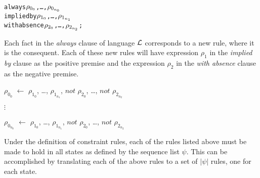 \documentclass[11pt]{report}
\newenvironment{vverbatim}
{
  \begin{alltt}
}
{
    \vspace{-\baselineskip}
  \end{alltt}
}
\newenvironment{vquote}
{
  \begin{list}{}{\leftmargin 1em}\item[]
}
{
  \end{list}
}
\begin{document}
            \begin{vverbatim}
  always \(\rho\sb{0\sb{0}}\), \ldots, \(\rho\sb{0\sb{n\sb{0}}}\)
    implied by \(\rho\sb{1\sb{0}}\), \ldots, \(\rho\sb{1\sb{n\sb{1}}}\)
    with absence \(\rho\sb{2\sb{0}}\), \ldots, \(\rho\sb{2\sb{n\sb{2}}}\);
            \end{vverbatim}

            Each fact in the {\em always} clause of language ${\cal L}$
            corresponds to a new rule, where it is the consequent. Each of
            these new rules will have expression $\rho_{1}$ in the
            {\em implied by} clause as the positive premise and the expression
            $\rho_{2}$ in the {\em with absence} clause as the negative
            premise.

            \begin{vquote}
              $\rho_{0_{0}}$ $\leftarrow$
                $\rho_{1_{0}}$, \ldots, $\rho_{1_{n_1}}$,
                $not$ $\rho_{2_{0}}$, \ldots, $not$ $\rho_{2_{n_2}}$

              $\vdots$

              $\rho_{0_{n_{0}}}$ $\leftarrow$
                $\rho_{1_{0}}$, \ldots, $\rho_{1_{n_1}}$,
                $not$ $\rho_{2_{0}}$, \ldots, $not$ $\rho_{2_{n_2}}$
            \end{vquote}

            Under the definition of constraint rules, each of the rules listed
            above must be made to hold in all states as defined by the sequence
            list $\psi$. This can be accomplished by translating each of the
            above rules to a set of $|\psi|$ rules, one for each state.
\end{document}
